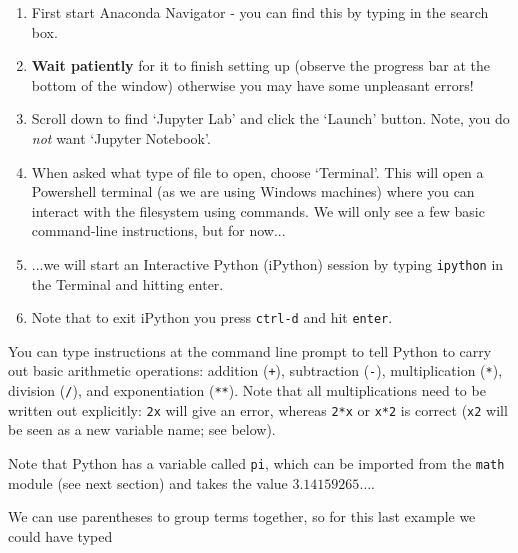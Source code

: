 \begin{enumerate}
  \item First start Anaconda Navigator - you can find this by typing in the
    search box.
  \item \textbf{Wait patiently} for it to finish setting up (observe
    the progress bar at the bottom of the window) otherwise you may
    have some unpleasant errors!
  \item Scroll down to find `Jupyter Lab' and click the `Launch'
    button. Note, you do \textit{not} want `Jupyter Notebook'.
  \item When asked what type of file to open, choose `Terminal'. This
    will open a Powershell terminal (as we are using Windows machines)
    where you can interact with the filesystem using commands. We will
    only see a few basic command-line instructions, but for now...
  \item ...we will start an Interactive Python (iPython) session by typing
    \texttt{ipython} in the Terminal and hitting enter.
  \item Note that to exit iPython you press \texttt{ctrl-d} and hit
    \texttt{enter}.
\end{enumerate}

You can type instructions at the command line prompt to tell Python to
carry out basic arithmetic operations: addition (\verb!+!),
subtraction (\verb!-!), multiplication (\verb!*!), division
(\verb!/!), and exponentiation (\verb!**!).  Note that all
multiplications need to be written out explicitly: {\tt 2x} will give
an error, whereas {\tt 2*x} or {\tt x*2} is correct ({\tt x2} will be
seen as a new variable name; see below).




{}

\vspace{5mm}
\noindent
Note that Python has a variable called \verb!pi!, which can be
imported from the \texttt{math} module (see next section) and takes
the value $3.14159265\ldots$.

We can use parentheses to group terms together, so for this last example we could have typed

